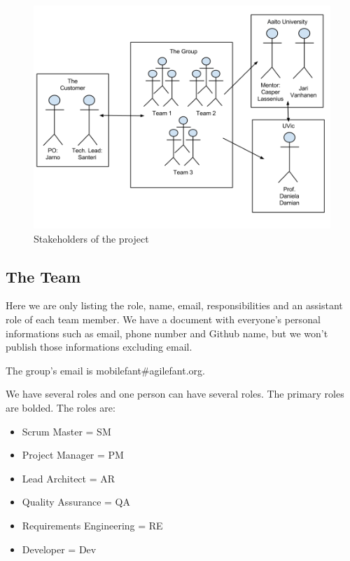 \begin{figure}[H]
\centering
\includegraphics[width=1\textwidth]{imgs/stakeholders.png}
\caption{Stakeholders of the project}
\label{fig:stakeholders}
\end{figure}

\subsection{The Team}

Here we are only listing the role, name, email, responsibilities and an 
assistant role of each team member. We have a document with everyone's personal 
informations such as email, phone number and Github name, but we won't publish 
those informations excluding email.

The group's email is mobilefant\#agilefant.org.

We have several roles and one person can have several roles. The primary roles are bolded. The roles are:

\begin{itemize}
\item Scrum Master = SM
\item Project Manager = PM
\item Lead Architect = AR
\item Quality Assurance = QA
\item Requirements Engineering = RE
\item Developer = Dev
\end{itemize}

